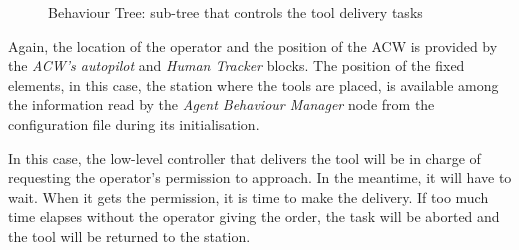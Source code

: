 \begin{figure}[ht]
\begin{center}
{}
		\caption{Behaviour Tree: sub-tree that controls the tool delivery tasks}
		\label{fig:DeliverToolTree}
	\end{center}
\end{figure}

Again, the location of the operator and the position of the \gls{ACW} is provided by the \emph{\gls{ACW}'s autopilot} and \emph{Human Tracker} blocks. The position of the fixed elements, in this case, the station where the tools are placed, is available among the information read by the \emph{Agent Behaviour Manager} node from the configuration file during its initialisation.

In this case, the low-level controller that delivers the tool will be in charge of requesting the operator's permission to approach. In the meantime, it will have to wait. When it gets the permission, it is time to make the delivery. If too much time elapses without the operator giving the order, the task will be aborted and the tool will be returned to the station.

